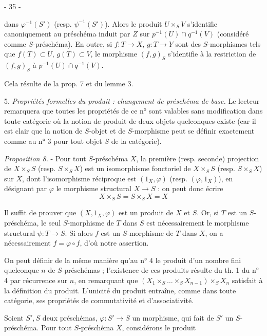 \newpage


- 35 -

dans $\varphi^{-1}(S')$ (resp. $\psi^{-1}(S')$). Alors le produit $U \times_S V$ s'identifie canoniquement au préschéma induit par $Z$ sur $p^{-1}(U) \cap q^{-1}(V)$ (considéré comme $S$-préschéma). En outre, si $f : T \to X$, $g : T \to Y$ sont des $S$-morphismes tels que $f(T) \subset U$, $g(T) \subset V$, le morphisme $(f,g)_S$ s'identifie à la restriction de $(f,g)_S$ à $p^{-1}(U) \cap q^{-1}(V)$.

Cela résulte de la prop. 7 et du lemme 3.

5. \emph{Propriétés formelles du produit : changement de préschéma de base.}
Le lecteur remarquera que toutes les propriétés de ce n° sont valables sans modification dans toute catégorie où la notion de produit de deux objets quelconques existe (car il est clair que la notion de $S$-objet et de $S$-morphisme peut se définir exactement comme au n° 3 pour tout objet $S$ de la catégorie).

\emph{Proposition 8.} - Pour tout $S$-préschéma $X$, la première (resp. seconde) projection de $X \times_S S$ (resp. $S \times_S X$) est un isomorphisme fonctoriel de $X \times_S S$ (resp. $S \times_S X$) sur $X$, dont l'isomorphisme réciproque est $(1_X, \varphi)$ (resp. $(\varphi, 1_X)$), en désignant par $\varphi$ le morphisme structural $X \to S$ : on peut donc écrire
$$ X \times_S S = S \times_S X = X $$

Il suffit de prouver que $(X, 1_X, \varphi)$ est un produit de $X$ et $S$. Or, si $T$ est un $S$-préschéma, le seul $S$-morphisme de $T$ dans $S$ est nécessairement le morphisme structural $\psi : T \to S$. Si alors $f$ est un $S$-morphisme de $T$ dans $X$, on a nécessairement $f = \varphi \circ f$, d'où notre assertion.

On peut définir de la même manière qu'au n° 4 le produit d'un nombre fini quelconque $n$ de $S$-préschémas ; l'existence de ces produits résulte du th. 1 du n° 4 par récurrence sur $n$, en remarquant que
$(X_1 \times_S \dots \times_S X_{n-1}) \times_S X_n$ satisfait à la définition du produit. L'unicité du produit entraîne, comme dans toute catégorie, ses propriétés de commutativité et d'associativité.

Soient $S', S$ deux préschémas, $\varphi : S' \to S$ un morphisme, qui fait de $S'$ un $S$-préschéma. Pour tout $S$-préschéma $X$, considérons le produit

\newpage

